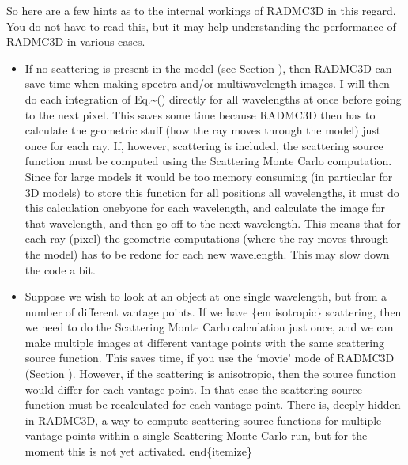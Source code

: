 \documentclass[letterpaper,10pt,english]{sphinxmanual}
\begin{document}
So here are a few hints as to the internal workings of RADMC\sphinxhyphen{}3D in this
regard. You do not have to read this, but it may help understanding the
performance of RADMC\sphinxhyphen{}3D in various cases.
\begin{itemize}
\item {} 

If no scattering is present in the model (see Section
{\hyperref[\detokenize{dustradtrans:sec-modes-of-scattering}]{}}), then RADMC\sphinxhyphen{}3D can save time when making
spectra and/or multi\sphinxhyphen{}wavelength images. I will then do each integration of
Eq.\textasciitilde{}() directly for all wavelengths at once before
going to the next pixel. This saves some time because RADMC\sphinxhyphen{}3D then has to
calculate the geometric stuff (how the ray moves through the model) just once
for each ray. If, however, scattering is included, the scattering source
function must be computed using the Scattering Monte Carlo computation. Since
for large models it would be too memory consuming (in particular for 3\sphinxhyphen{}D
models) to store this function for all positions  all wavelengths, it
must do this calculation one\sphinxhyphen{}by\sphinxhyphen{}one for each wavelength, and calculate the
image for that wavelength, and then go off to the next wavelength. This means
that for each ray (pixel) the geometric computations (where the ray moves
through the model) has to be redone for each new wavelength. This may slow
down the code a bit.

\item {} 

Suppose we wish to look at an object at one single wavelength, but from a
number of different vantage points. If we have \{em isotropic\} scattering,
then we need to do the Scattering Monte Carlo calculation just once, and we
can make multiple images at different vantage points with the same scattering
source function. This saves time, if you use the ‘movie’ mode of RADMC\sphinxhyphen{}3D
(Section {\hyperref[\detokenize{imagesspectra:sec-movie-mode}]{}}). However, if the scattering is anisotropic,
then the source function would differ for each vantage point.  In that case
the scattering source function must be recalculated for each vantage
point. There is, deeply hidden in RADMC\sphinxhyphen{}3D, a way to compute scattering source
functions for multiple vantage points within a single Scattering Monte Carlo
run, but for the moment this is not yet activated.  end\{itemize\}

\end{itemize}
\end{document}
